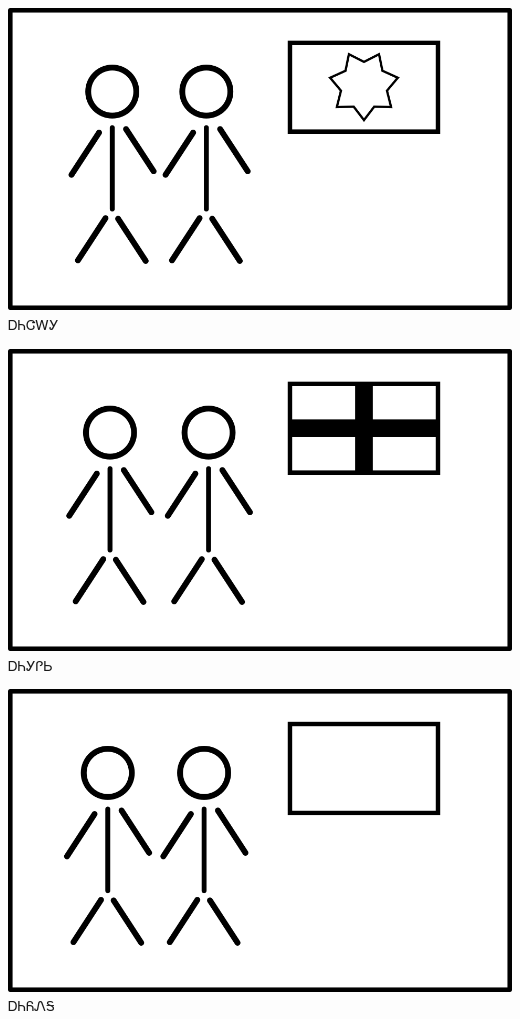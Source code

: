 \documentclass[avery5371]{flashcards}%
\begin{document}
\begin{flashcard}{
\includegraphics[width=0.95\columnwidth,height=.51\columnwidth,keepaspectratio]{../artwork/flags/anijalagi-flag}
}\Huge ᎠᏂᏣᎳᎩ
\end{flashcard}

\begin{flashcard}{
\includegraphics[width=0.95\columnwidth,height=.51\columnwidth,keepaspectratio]{../artwork/flags/anigilisi-flag}
}\Huge ᎠᏂᎩᎵᏏ
\end{flashcard}

\begin{flashcard}{
\includegraphics[width=0.95\columnwidth,height=.51\columnwidth,keepaspectratio]{../artwork/flags/aniyonega-flag}
}\Huge ᎠᏂᏲᏁᎦ
\end{flashcard}
\end{document}
